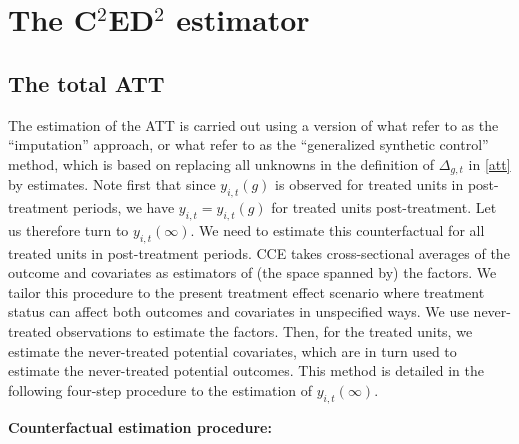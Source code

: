 \documentclass[12pt,fleqn]{article}
\begin{document}
\section{The C$^2$ED$^2$ estimator}

\subsection{The total ATT}

The estimation of the ATT is carried out using a version of what \citet{borusyak2021revisiting} refer to as the ``imputation'' approach, or what \citet{Xu_2017} refer to as the ``generalized synthetic control'' method, which is based on replacing all unknowns in the definition of $\Delta_{g,t}$ in \eqref{att} by estimates. Note first that since $y_{i,t}(g)$ is observed for treated units in post-treatment periods, we have $y_{i,t} = y_{i,t}(g)$ for treated units post-treatment. Let us therefore turn to $y_{i,t}(\infty)$. We need to estimate this counterfactual for all treated units in post-treatment periods. CCE takes cross-sectional averages of the outcome and covariates as estimators of (the space spanned by) the factors. We tailor this procedure to the present treatment effect scenario where treatment status can affect both outcomes and covariates in unspecified ways. We use never-treated observations to estimate the factors. Then, for the treated units, we estimate the never-treated potential covariates, which are in turn used to estimate the never-treated potential outcomes. This method is detailed in the following four-step procedure to the estimation of $y_{i,t}(\infty)$.

\bigskip

\noindent \textbf{Counterfactual estimation procedure:}
\end{document}
